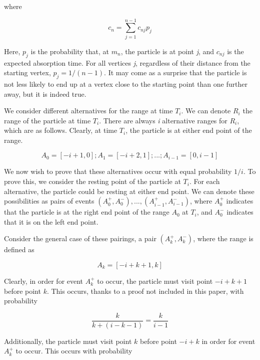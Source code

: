 \documentclass[11pt]{article}
\begin{document}
\noindent where

\begin{equation}
c_{n} = \sum_{j=1}^{n-1} c_{nj} p_{j}
\end{equation}

Here, $p_{j}$ is the probability that, at $m_{n}$, the particle is at point \textit{j}, and $c_{nj}$ is the expected absorption time. For all vertices \textit{j}, regardless of their distance from the starting vertex, $p_{j} = 1/(n-1)$. It may come as a surprise that the particle is not less likely to end up at a vertex close to the starting point than one further away, but it is indeed true. 

We consider different alternatives for the range at time $T_{i}$. We can denote $R_{i}$ the range of the particle at time $T_{i}$. There are always \textit{i} alternative ranges for $R_{i}$, which are as follows. Clearly, at time $T_{i}$, the particle is at either end point of the range.

 \begin{equation}
A_{0} = [-i + 1, 0]; A_{1} = [-i + 2, 1]; . . . ; A_{i-1} = [0, i - 1]
\end{equation}

We now wish to prove that these alternatives occur with equal probability $1/i$. To prove this, we consider the resting point of the particle at $T_{i}$. For each alternative, the particle could be resting at either end point. We can denote these possibilities as pairs of events $(A_{0}^{+}, A_{0}^{-}), ... , (A_{i-1}^{+}, A_{i-1}^{-})$, where $A_{0}^{+}$ indicates that the particle is at the right end point of the range $A_{0}$ at $T_{i}$, and $A_{0}^{-}$ indicates that it is on the left end point. 

Consider the general case of these pairings, a pair $(A_{k}^{+}, A_{k}^{-})$, where the range is defined as

 \begin{equation}
A_{k} = [-i + k + 1, k]
\end{equation}

\noindent Clearly, in order for event $A_{k}^{+}$ to occur, the particle must visit point $-i + k + 1$ before point $k$. This occurs, thanks to a proof not included in this paper, with probability 

\begin{equation}
\frac{k}{k + (i - k - 1)} = \frac{k}{i - 1}
\end{equation}

\noindent Additionally, the particle must visit point $k$ before point $-i + k$ in order for event $A_{k}^{+}$ to occur. This occurs with probability 
\end{document}
